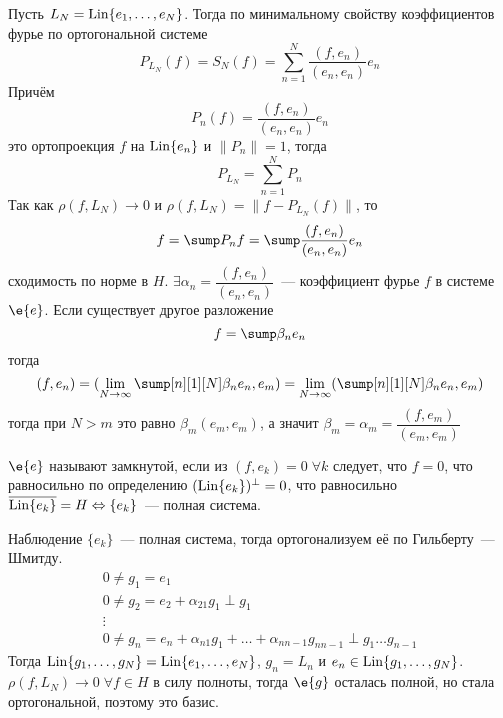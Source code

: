 \documentclass[14pt]{extarticle}
\begin{document}
\begin{Proof}
    Пусть $L_N = \operatorname{Lin}\{e_1,\dots, e_N\}$.
    Тогда по минимальному свойству коэффициентов фурье по ортогональной системе
    $$
    P_{L_N}(f) = S_N(f) = \sum\limits_{n = 1}^N\dfrac{(f, e_n)}{(e_n, e_n)}e_n
    $$
    Причём
    $$
    P_n(f) = \dfrac{(f, e_n)}{(e_n, e_n)}e_n
    $$
    это ортопроекция $f$  на $\operatorname{Lin}\{e_n\}$ и $\|P_n\| = 1$, тогда
    $$
    P_{L_N} = \sum\limits_{n = 1}^N P_n
    $$
    Так как $\rho(f, L_N) \to 0$ и $\rho(f, L_N) = \|f - P_{L_N}(f)\|$, то
    $$
    f = \sump P_nf = \sump \dfrac{(f, e_n)}{(e_n, e_n)}e_n
    $$
    сходимость по норме в $H$.
    $\exists \alpha_n = \dfrac{(f, e_n)}{(e_n, e_n)}$~--- коэффициент фурье $f$ в системе
    $\e{e}$.
    Если существует другое разложение
    $$
    f = \sump \beta_n e_n
    $$
    тогда
    $$
    (f, e_n) = (\lim_{N \to \infty} \sump[n][1][N] \beta_n e_n, e_m) = \lim_{N \to \infty}
    ( \sump[n][1][N] \beta_n e_n, e_m)
    $$
    тогда при $N > m$ это равно $\beta_m (e_m, e_m)$, а значит $\beta_m = \alpha_m =
    \dfrac{(f, e_m)}{(e_m, e_m)}$
\end{Proof}
\begin{Opr}
    $\e{e}$ называют замкнутой, если из $(f, e_k) = 0\; \forall k$ следует, что $f = 0$, что
    равносильно по определению $(\operatorname{Lin}\{e_k\})^\perp = 0$, что равносильно 
    $\overline{\operatorname{Lin}\{e_k\}} = H \Leftrightarrow \{e_k\}$~--- полная система.
\end{Opr}
\begin{MathCl}{Наблюдение}
    $\{e_k\}$~--- полная система, тогда ортогонализуем её по Гильберту~--- Шмитду.
    \begin{gather*}
        0 \ne g_1 = e_1\\
        0 \ne g_2 = e_2 + \alpha_{21}g_1 \perp g_1\\
        \vdots\\
        0 \ne g_n = e_n + \alpha_{n1}g_1 + \dots + \alpha_{n n-1}g_{nn - 1} \perp g_1 \dots g_
        {n - 1}
    \end{gather*}
    Тогда $\operatorname{Lin}\{g_1,\dots, g_N\} = \operatorname{Lin}\{e_1,\dots, e_N\}$, $g_n = L_n$ и $e_n \in \operatorname{Lin}\{g_1,\dots, g_N\}$.
    $\rho(f, L_N) \to 0\;\forall f \in H$ в силу полноты, тогда $\e{g}$ осталась полной, но 
    стала ортогональной, поэтому это базис.
\end{MathCl}
\end{document}
